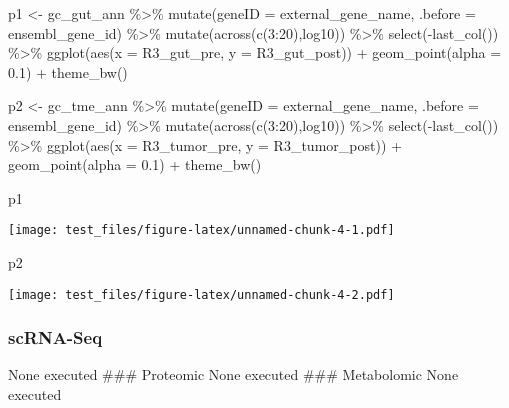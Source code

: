 \documentclass[
]{article}
\newenvironment{Shaded}{\begin{snugshade}}{\end{snugshade}}
\newcommand{\AttributeTok}[1]{\textcolor[rgb]{0.77,0.63,0.00}{#1}}
\newcommand{\DecValTok}[1]{\textcolor[rgb]{0.00,0.00,0.81}{#1}}
\newcommand{\FloatTok}[1]{\textcolor[rgb]{0.00,0.00,0.81}{#1}}
\newcommand{\FunctionTok}[1]{\textcolor[rgb]{0.00,0.00,0.00}{#1}}
\newcommand{\NormalTok}[1]{#1}
\newcommand{\OtherTok}[1]{\textcolor[rgb]{0.56,0.35,0.01}{#1}}
\newcommand{\SpecialCharTok}[1]{\textcolor[rgb]{0.00,0.00,0.00}{#1}}
\begin{document}
\begin{Shaded}
\begin{Highlighting}[]
\NormalTok{p1 }\OtherTok{\textless{}{-}}\NormalTok{ gc\_gut\_ann }\SpecialCharTok{\%\textgreater{}\%}
  \FunctionTok{mutate}\NormalTok{(}\AttributeTok{geneID =}\NormalTok{ external\_gene\_name, }\AttributeTok{.before =}\NormalTok{  ensembl\_gene\_id) }\SpecialCharTok{\%\textgreater{}\%}
  \FunctionTok{mutate}\NormalTok{(}\FunctionTok{across}\NormalTok{(}\FunctionTok{c}\NormalTok{(}\DecValTok{3}\SpecialCharTok{:}\DecValTok{20}\NormalTok{),log10)) }\SpecialCharTok{\%\textgreater{}\%}
  \FunctionTok{select}\NormalTok{(}\SpecialCharTok{{-}}\FunctionTok{last\_col}\NormalTok{()) }\SpecialCharTok{\%\textgreater{}\%}
  \FunctionTok{ggplot}\NormalTok{(}\FunctionTok{aes}\NormalTok{(}\AttributeTok{x =}\NormalTok{ R3\_gut\_pre, }\AttributeTok{y =}\NormalTok{ R3\_gut\_post)) }\SpecialCharTok{+} 
  \FunctionTok{geom\_point}\NormalTok{(}\AttributeTok{alpha =} \FloatTok{0.1}\NormalTok{) }\SpecialCharTok{+}
  \FunctionTok{theme\_bw}\NormalTok{()}

\NormalTok{p2 }\OtherTok{\textless{}{-}}\NormalTok{ gc\_tme\_ann }\SpecialCharTok{\%\textgreater{}\%}
  \FunctionTok{mutate}\NormalTok{(}\AttributeTok{geneID =}\NormalTok{ external\_gene\_name, }\AttributeTok{.before =}\NormalTok{  ensembl\_gene\_id) }\SpecialCharTok{\%\textgreater{}\%}
  \FunctionTok{mutate}\NormalTok{(}\FunctionTok{across}\NormalTok{(}\FunctionTok{c}\NormalTok{(}\DecValTok{3}\SpecialCharTok{:}\DecValTok{20}\NormalTok{),log10)) }\SpecialCharTok{\%\textgreater{}\%}
  \FunctionTok{select}\NormalTok{(}\SpecialCharTok{{-}}\FunctionTok{last\_col}\NormalTok{()) }\SpecialCharTok{\%\textgreater{}\%}
  \FunctionTok{ggplot}\NormalTok{(}\FunctionTok{aes}\NormalTok{(}\AttributeTok{x =}\NormalTok{ R3\_tumor\_pre, }\AttributeTok{y =}\NormalTok{ R3\_tumor\_post)) }\SpecialCharTok{+} 
  \FunctionTok{geom\_point}\NormalTok{(}\AttributeTok{alpha =} \FloatTok{0.1}\NormalTok{) }\SpecialCharTok{+}
  \FunctionTok{theme\_bw}\NormalTok{()}

\NormalTok{p1}
\end{Highlighting}
\end{Shaded}

\texttt{[image: test\_files/figure-latex/unnamed-chunk-4-1.pdf]}

\begin{Shaded}
\begin{Highlighting}[]
\NormalTok{p2}
\end{Highlighting}
\end{Shaded}

\texttt{[image: test\_files/figure-latex/unnamed-chunk-4-2.pdf]}

\hypertarget{scrna-seq}{%
\subsubsection{scRNA-Seq}\label{scrna-seq}}

None executed \#\#\# Proteomic None executed \#\#\# Metabolomic None
executed
\end{document}
